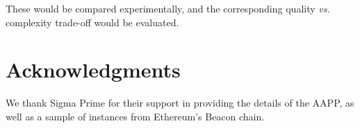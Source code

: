 \documentclass{article}
\begin{document}
\noindent
These would be compared experimentally, and the corresponding quality
\emph{vs.} complexity trade-off would be evaluated.

\section*{Acknowledgments}

We thank Sigma Prime for their support in providing the details of the AAPP, as
well as a sample of instances from Ethereum's Beacon chain. 



\end{document}
